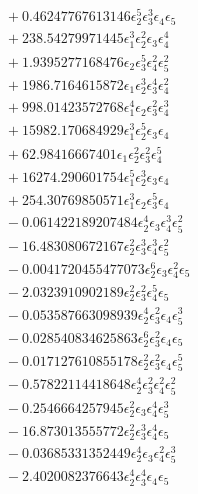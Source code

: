 \documentclass[10pt]{article}
\begin{document}
\begin{align*}
&{}  + 0.46247767613146 \epsilon_{2}^{5} \epsilon_{3}^{3} \epsilon_{4} \epsilon_{5} \\
&{}  + 238.54279971445 \epsilon_{1}^{3} \epsilon_{2}^{2} \epsilon_{3} \epsilon_{4}^{4} \\
&{}  + 1.9395277168476 \epsilon_{2} \epsilon_{3}^{5} \epsilon_{4}^{2} \epsilon_{5}^{2} \\
&{}  + 1986.7164615872 \epsilon_{1} \epsilon_{2}^{3} \epsilon_{3}^{4} \epsilon_{4}^{2} \\
&{}  + 998.01423572768 \epsilon_{1}^{4} \epsilon_{2} \epsilon_{3}^{2} \epsilon_{4}^{3} \\
&{}  + 15982.170684929 \epsilon_{1}^{3} \epsilon_{2}^{5} \epsilon_{3} \epsilon_{4} \\
&{}  + 62.98416667401 \epsilon_{1} \epsilon_{2}^{2} \epsilon_{3}^{2} \epsilon_{4}^{5} \\
&{}  + 16274.290601754 \epsilon_{1}^{5} \epsilon_{2}^{3} \epsilon_{3} \epsilon_{4} \\
&{}  + 254.30769850571 \epsilon_{1}^{3} \epsilon_{2} \epsilon_{3}^{5} \epsilon_{4} \\
&{}  - 0.061422189207484 \epsilon_{2}^{4} \epsilon_{3} \epsilon_{4}^{3} \epsilon_{5}^{2} \\
&{}  - 16.483080672167 \epsilon_{2}^{2} \epsilon_{3}^{3} \epsilon_{4}^{3} \epsilon_{5}^{2} \\
&{}  - 0.0041720455477073 \epsilon_{2}^{6} \epsilon_{3} \epsilon_{4}^{2} \epsilon_{5} \\
&{}  - 2.0323910902189 \epsilon_{2}^{2} \epsilon_{3}^{2} \epsilon_{4}^{5} \epsilon_{5} \\
&{}  - 0.053587663098939 \epsilon_{2}^{4} \epsilon_{3}^{2} \epsilon_{4} \epsilon_{5}^{3} \\
&{}  - 0.028540834625863 \epsilon_{2}^{6} \epsilon_{3}^{2} \epsilon_{4} \epsilon_{5} \\
&{}  - 0.017127610855178 \epsilon_{2}^{2} \epsilon_{3}^{2} \epsilon_{4} \epsilon_{5}^{5} \\
&{}  - 0.57822114418648 \epsilon_{2}^{4} \epsilon_{3}^{2} \epsilon_{4}^{2} \epsilon_{5}^{2} \\
&{}  - 0.2546664257945 \epsilon_{2}^{2} \epsilon_{3} \epsilon_{4}^{4} \epsilon_{5}^{3} \\
&{}  - 16.873013555772 \epsilon_{2}^{2} \epsilon_{3}^{3} \epsilon_{4}^{4} \epsilon_{5} \\
&{}  - 0.03685331352449 \epsilon_{2}^{4} \epsilon_{3} \epsilon_{4}^{2} \epsilon_{5}^{3} \\
&{}  - 2.4020082376643 \epsilon_{2}^{4} \epsilon_{3}^{4} \epsilon_{4} \epsilon_{5} \\

\end{align*}
\end{document}
